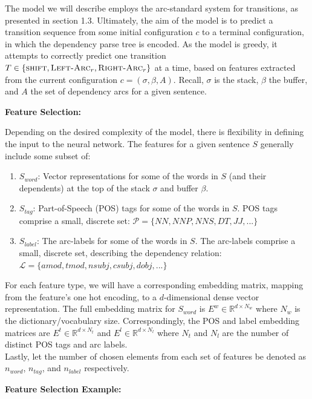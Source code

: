 \documentclass{tufte-handout}
\begin{document}
The model we will describe employs the arc-standard system for transitions, as presented in section 1.3. Ultimately, the aim of the model is to predict a transition sequence from some initial configuration $c$ to a terminal configuration, in which the dependency parse tree is encoded. As the model is greedy, it attempts to correctly predict one transition $T\in\{\textsc{shift},\textsc{Left-Arc}_r,\textsc{Right-Arc}_r\}$ at a time, based on features extracted from the current configuration $c=(\sigma, \beta, A)$. Recall, $\sigma$ is the stack, $\beta$ the buffer, and $A$ the set of dependency arcs for a given sentence.
\par%
\bigskip
\textbf{Feature Selection:}
\par%
\bigskip

Depending on the desired complexity of the model, there is flexibility in defining the input to the neural network. The features for a given sentence $S$ generally include some subset of:

\begin{enumerate}
\item $S_{word}$: Vector representations for some of the words in $S$ (and their dependents) at the top of the stack $\sigma$ and buffer $\beta$.
\item $S_{tag}$: Part-of-Speech (POS) tags for some of the words in $S$. POS tags comprise a small, discrete set: $\mathcal{P}=\{NN,NNP,NNS,DT,JJ,...\}$ 
\item $S_{label}$: The arc-labels for some of the words in $S$. The arc-labels comprise a small, discrete set, describing the dependency relation: $\mathcal{L}=\{amod,tmod,nsubj,csubj,dobj,...\}$
\end{enumerate}
For each feature type, we will have a corresponding embedding matrix, mapping from the feature's one hot encoding, to a $d$-dimensional dense vector representation. The full embedding matrix for $S_{word}$ is $E^w \in \mathbb{R}^{d \times N_w}$ where $N_w$ is the dictionary/vocabulary size. Correspondingly, the POS and label embedding matrices are $E^t \in \mathbb{R}^{d \times N_t}$ and $E^l \in \mathbb{R}^{d \times N_l}$ where $N_t$ and $N_l$ are the number of distinct POS tags and arc labels. \\
Lastly, let the number of chosen elements from each set of features be denoted as $n_{word}$, $n_{tag}$, and $n_{label}$ respectively. \\

\par%
\bigskip
\textbf{Feature Selection Example:}
\par%
\bigskip
\end{document}
